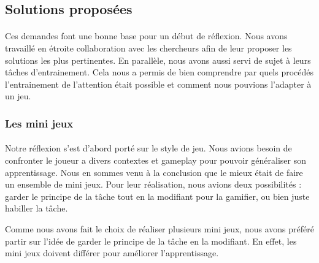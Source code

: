 \subsection{Solutions proposées}

\paragraph{}Ces demandes font une bonne base pour un début de réflexion. Nous avons travaillé en étroite collaboration avec les chercheurs afin de leur proposer les solutions les plus
pertinentes. En parallèle, nous avons aussi servi de sujet à leurs tâches d'entrainement. Cela nous a permis de bien comprendre par quels procédés l'entrainement de l'attention était
possible et comment nous pouvions l'adapter à un jeu.

\subsubsection{Les mini jeux}

\paragraph{}Notre réflexion s'est d'abord porté sur le style de jeu. Nous avions besoin de confronter le joueur a divers contextes et gameplay pour pouvoir généraliser
son apprentissage. Nous en sommes venu à la conclusion que le mieux était de faire un ensemble de mini jeux. Pour leur réalisation, nous avions deux possibilités : garder le principe
de la tâche tout en la modifiant pour la gamifier, ou bien juste habiller la tâche.

Comme nous avons fait le choix de réaliser plusieurs mini jeux, nous avons préféré partir sur l'idée de garder le principe de la tâche en la modifiant. En effet, les mini jeux doivent
différer pour améliorer l'apprentissage.


